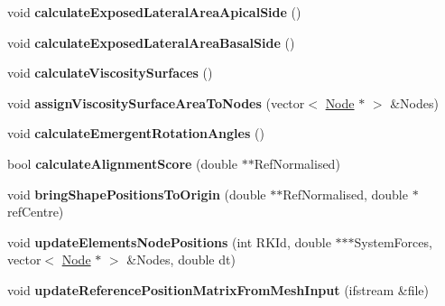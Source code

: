 \begin{DoxyCompactItemize}
\item 
\hypertarget{classShapeBase_ad1b05163ccd8be1e0be597a1adcfaa61}{}void {\bfseries calculate\+Exposed\+Lateral\+Area\+Apical\+Side} ()\label{classShapeBase_ad1b05163ccd8be1e0be597a1adcfaa61}

\item 
\hypertarget{classShapeBase_af8dd13be97a9a6a6c99636d7410fff87}{}void {\bfseries calculate\+Exposed\+Lateral\+Area\+Basal\+Side} ()\label{classShapeBase_af8dd13be97a9a6a6c99636d7410fff87}

\item 
\hypertarget{classShapeBase_a384ff1314700f9c7157e702c277d2819}{}void {\bfseries calculate\+Viscosity\+Surfaces} ()\label{classShapeBase_a384ff1314700f9c7157e702c277d2819}

\item 
\hypertarget{classShapeBase_a3ed8350b9a657a9f6543520b0a9e5a67}{}void {\bfseries assign\+Viscosity\+Surface\+Area\+To\+Nodes} (vector$<$ \hyperlink{classNode}{Node} $\ast$ $>$ \&Nodes)\label{classShapeBase_a3ed8350b9a657a9f6543520b0a9e5a67}

\item 
\hypertarget{classShapeBase_af616bee3616ec9d1f99628745f330ad7}{}void {\bfseries calculate\+Emergent\+Rotation\+Angles} ()\label{classShapeBase_af616bee3616ec9d1f99628745f330ad7}

\item 
\hypertarget{classShapeBase_a1578faef4bfc3c8de9f8f94fd9e6b52d}{}bool {\bfseries calculate\+Alignment\+Score} (double $\ast$$\ast$Ref\+Normalised)\label{classShapeBase_a1578faef4bfc3c8de9f8f94fd9e6b52d}

\item 
\hypertarget{classShapeBase_aa07ce2dcc297aa5aea5a37516dcea069}{}void {\bfseries bring\+Shape\+Positions\+To\+Origin} (double $\ast$$\ast$Ref\+Normalised, double $\ast$ref\+Centre)\label{classShapeBase_aa07ce2dcc297aa5aea5a37516dcea069}

\item 
\hypertarget{classShapeBase_af4df88dad7ec1c487736216e15b5c67a}{}void {\bfseries update\+Elements\+Node\+Positions} (int R\+K\+Id, double $\ast$$\ast$$\ast$System\+Forces, vector$<$ \hyperlink{classNode}{Node} $\ast$ $>$ \&Nodes, double dt)\label{classShapeBase_af4df88dad7ec1c487736216e15b5c67a}

\item 
\hypertarget{classShapeBase_a29d28195e334308f1b3afba113ef1212}{}void {\bfseries update\+Reference\+Position\+Matrix\+From\+Mesh\+Input} (ifstream \&file)\label{classShapeBase_a29d28195e334308f1b3afba113ef1212}


\end{DoxyCompactItemize}
